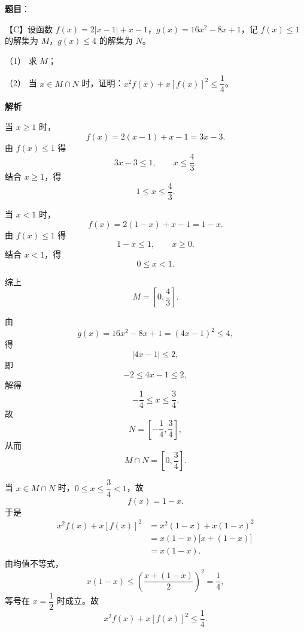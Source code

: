 \begin{answer}

\textbf{题目}：

【C】设函数 $f(x)=2|x-1|+x-1$，$g(x)=16x^2-8x+1$，记 $f(x)\leqslant 1$ 的解集为 $M$，$g(x)\leqslant 4$ 的解集为 $N$。

（1） 求 $M$；

（2） 当 $x\in M\cap N$ 时，证明：$x^2f(x)+x[f(x)]^2\leqslant\dfrac14$。

\textbf{解析}


当 $x\geqslant1$ 时，
\nopagebreak[4]
\[f(x)=2(x-1)+x-1=3x-3.\]
由 $f(x)\leqslant1$ 得
\nopagebreak[4]
\[3x-3\leqslant1,\qquad x\leqslant\frac43.\]
结合 $x\geqslant1$，得
\nopagebreak[4]
\[1\leqslant x\leqslant\frac43.\]

当 $x<1$ 时，
\nopagebreak[4]
\[f(x)=2(1-x)+x-1=1-x.\]
由 $f(x)\leqslant1$ 得
\nopagebreak[4]
\[1-x\leqslant1,\qquad x\geqslant0.\]
结合 $x<1$，得
\nopagebreak[4]
\[0\leqslant x<1.\]

综上
\nopagebreak[4]
\[M=\left[0,\frac43\right].\]


由
\nopagebreak[4]
\[g(x)=16x^2-8x+1=(4x-1)^2\leqslant4,\]
得
\nopagebreak[4]
\[|4x-1|\leqslant2,\]
即
\nopagebreak[4]
\[-2\leqslant4x-1\leqslant2,\]
解得
\nopagebreak[4]
\[-\frac14\leqslant x\leqslant\frac34.\]
故
\nopagebreak[4]
\[N=\left[-\frac14,\frac34\right],\]
从而
\nopagebreak[4]
\[M\cap N=\left[0,\frac34\right].\]

当 $x\in M\cap N$ 时，$0\leqslant x\leqslant\dfrac34<1$，故
\nopagebreak[4]
\[f(x)=1-x.\]
于是
\nopagebreak[4]
\[\begin{aligned}
x^2f(x)+x[f(x)]^2
&=x^2(1-x)+x(1-x)^2\\
&=x(1-x)\bigl[x+(1-x)\bigr]\\
&=x(1-x).
\end{aligned}\]
由均值不等式，
\nopagebreak[4]
\[x(1-x)\leqslant\left(\frac{x+(1-x)}2\right)^2=\frac14,\]
等号在 $x=\dfrac12$ 时成立。故
\nopagebreak[4]
\[x^2f(x)+x[f(x)]^2\leqslant\frac14.\]



\end{answer}